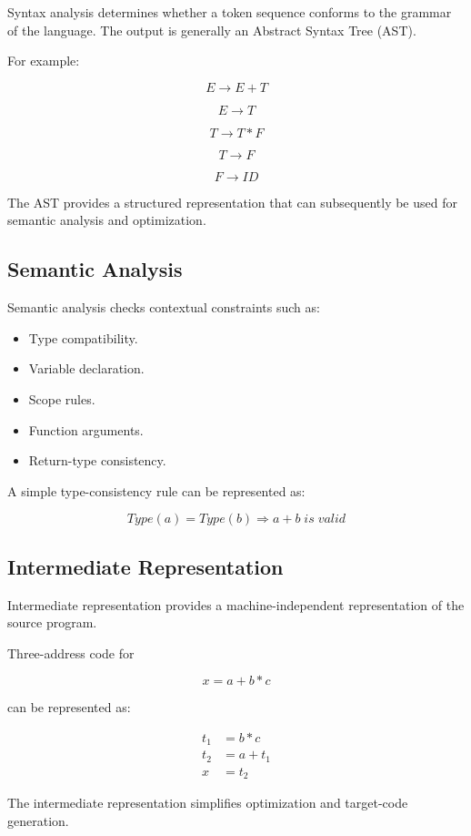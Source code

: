 \documentclass[12pt,a4paper]{article}
\begin{document}
Syntax analysis determines whether a token sequence conforms to the grammar
of the language. The output is generally an Abstract Syntax Tree (AST).

For example:

\[
E \rightarrow E+T
\]

\[
E \rightarrow T
\]

\[
T \rightarrow T*F
\]

\[
T \rightarrow F
\]

\[
F \rightarrow ID
\]

The AST provides a structured representation that can subsequently be used
for semantic analysis and optimization.

\subsection{Semantic Analysis}

Semantic analysis checks contextual constraints such as:

\begin{itemize}
    \item Type compatibility.
    \item Variable declaration.
    \item Scope rules.
    \item Function arguments.
    \item Return-type consistency.
\end{itemize}

A simple type-consistency rule can be represented as:

\[
Type(a)=Type(b)\Rightarrow a+b\;is\;valid
\]

\subsection{Intermediate Representation}

Intermediate representation provides a machine-independent representation of
the source program.

Three-address code for

\[
x=a+b*c
\]

can be represented as:

\begin{align}
t_1 &= b*c\\
t_2 &= a+t_1\\
x &= t_2
\end{align}

The intermediate representation simplifies optimization and target-code
generation.
\end{document}
